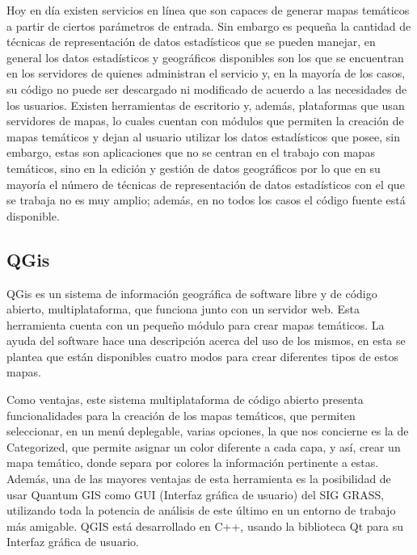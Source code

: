 Hoy en d\'ia existen servicios en l\'inea que son capaces de generar mapas tem\'aticos a partir de ciertos par\'ametros de entrada. Sin embargo es peque\~na la cantidad de t\'ecnicas de representaci\'on de datos estad\'isticos que se pueden manejar, en general los datos estad\'isticos y geogr\'aficos disponibles son los que se encuentran en los servidores de quienes administran el servicio y, en la mayor\'ia de los casos, su c\'odigo no puede ser descargado ni modificado de acuerdo a las necesidades de los usuarios. Existen herramientas de escritorio y, adem\'as, plataformas que usan servidores de mapas, lo cuales cuentan con m\'odulos que permiten la creaci\'on de mapas tem\'aticos y dejan al usuario utilizar los datos estad\'isticos que posee, sin embargo, estas son aplicaciones que no se centran en el trabajo con mapas tem\'aticos, sino en la edici\'on y gesti\'on de datos geogr\'aficos por lo que en su mayor\'ia el n\'umero de t\'ecnicas de representaci\'on de datos estad\'isticos con el que se trabaja no es muy amplio; adem\'as, en no todos los casos el c\'odigo fuente est\'a disponible.


\subsection{QGis}
QGis es un sistema de informaci\'on geogr\'afica de software libre y de c\'odigo abierto, multiplataforma, que funciona junto con un servidor web. Esta herramienta cuenta con un peque\~no m\'odulo para crear mapas tem\'aticos. La ayuda del software hace una descripci\'on acerca del uso de los mismos, en esta se plantea que est\'an disponibles cuatro modos para crear diferentes tipos de estos mapas.  

Como ventajas, este sistema multiplataforma de c\'odigo abierto presenta funcionalidades para la creaci\'on de los mapas tem\'aticos, que permiten seleccionar, en un men\'u deplegable, varias opciones, la que nos concierne es la de Categorized, que permite asignar un color diferente a cada capa, y as\'i, crear un mapa tem\'atico, donde separa por colores la informaci\'on pertinente a estas. Adem\'as, una de las mayores ventajas de esta herramienta es la posibilidad de usar Quantum GIS como GUI (Interfaz gr\'afica de usuario) del SIG GRASS, utilizando toda la potencia de an\'alisis de este \'ultimo en un entorno de trabajo m\'as amigable. QGIS est\'a desarrollado en C++, usando la biblioteca Qt para su Interfaz gr\'afica de usuario.


